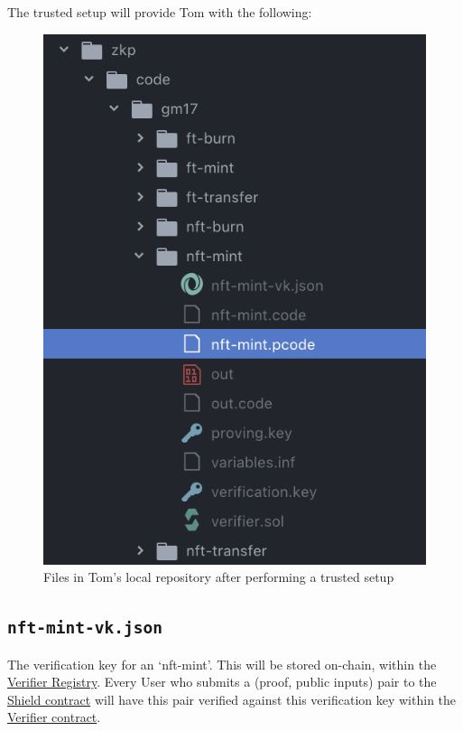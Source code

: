 \documentclass{article}
\begin{document}
The trusted setup will provide Tom with the following:

\begin{figure}[H]
  \centering
  \includegraphics[scale=0.65]{files-after-setup.png}
  \caption{Files in Tom's local repository after performing a trusted setup}
  \label{pic:filesAfterSetup}
\end{figure}

\subsection*{\texttt{nft-mint-vk.json}}
The verification key for an `nft-mint'. This will be stored on-chain, within the \hyperref[sec:smartContracts]{Verifier Registry}. Every User who submits a (proof, public inputs) pair to the \hyperref[sec:smartContracts]{Shield contract} will have this pair verified against this verification key within the \hyperref[sec:smartContracts]{Verifier contract}.
\end{document}
